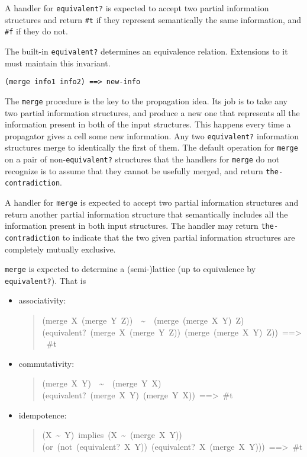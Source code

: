 \documentclass[12pt,letterpaper,english]{article}
\begin{document}
A handler for \texttt{equivalent?} is expected to accept two partial
information structures and return \texttt{{\#}t} if they represent
semantically the same information, and \texttt{{\#}f} if they do not.

The built-in \texttt{equivalent?} determines an equivalence relation.
Extensions to it must maintain this invariant.

\texttt{(merge info1 info2)  ==>  new-info}

The \texttt{merge} procedure is the key to the propagation idea.  Its job
is to take any two partial information structures, and produce a new
one that represents all the information present in both of the
input structures.  This happens every time a propagator gives a cell
some new information.  Any two \texttt{equivalent?} information structures
merge to identically the first of them.  The default operation for
\texttt{merge} on a pair of non-\texttt{equivalent?} structures that the handlers for
\texttt{merge} do not recognize is to assume that they cannot be usefully
merged, and return \texttt{the-contradiction}.

A handler for \texttt{merge} is expected to accept two partial
information structures and return another partial information
structure that semantically includes all the information present in
both input structures.  The handler may return
\texttt{the-contradiction} to indicate that the two given partial
information structures are completely mutually exclusive.

\texttt{merge} is expected to determine a (semi-)lattice (up to equivalence
by \texttt{equivalent?}).  That is
\begin{itemize}
\item {} 
associativity:
\begin{quote}{\ttfamily \raggedright \noindent
(merge~X~(merge~Y~Z))~~{\textasciitilde}~~(merge~(merge~X~Y)~Z)~\\
(equivalent?~(merge~X~(merge~Y~Z))~(merge~(merge~X~Y)~Z))~==>~{\#}t
}\end{quote}
\item {} 
commutativity:
\begin{quote}{\ttfamily \raggedright \noindent
(merge~X~Y)~~{\textasciitilde}~~(merge~Y~X)~\\
(equivalent?~(merge~X~Y)~(merge~Y~X))~==>~{\#}t
}\end{quote}
\item {} 
idempotence:
\begin{quote}{\ttfamily \raggedright \noindent
(X~{\textasciitilde}~Y)~implies~(X~{\textasciitilde}~(merge~X~Y))~\\
(or~(not~(equivalent?~X~Y))~(equivalent?~X~(merge~X~Y)))~==>~{\#}t
}\end{quote}
\end{itemize}
\end{document}
